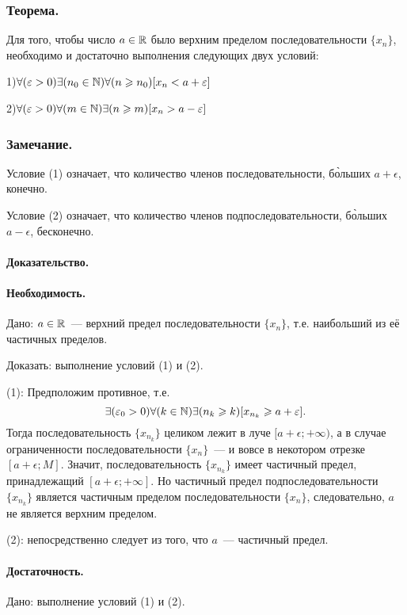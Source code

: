 \subsubsection{Теорема.}

Для того, чтобы число $a \in \mathbb{R}$ было верхним пределом последовательности $\{x_n\}$, необходимо и достаточно выполнения следующих двух условий:

1)$\forall(\varepsilon >0 )\exists(n_0 \in \mathbb{N})\forall(n \geqslant n_0)[x_n < a + \varepsilon]$

2)$\forall(\varepsilon > 0)\forall(m   \in \mathbb{N})\exists(n \geqslant m  )[x_n > a - \varepsilon]$

\subsubsection{Замечание.}
Условие (1) означает, что количество членов последовательности, б\`{о}льших $a+\epsilon$, конечно.

Условие (2) означает, что количество членов подпоследовательности, б\`{о}льших $a-\epsilon$, бесконечно.

\paragraph{Доказательство.}

\paragraph{Необходимость.}
Дано:
$a \in \mathbb{R}$~--- верхний предел последовательности $\{x_n\}$, т.е. наибольший из её частичных пределов.

Доказать: выполнение условий (1) и (2).

(1): Предположим противное, т.е.
$$
	\exists(\varepsilon_0 >0 )\forall(k \in \mathbb{N})\exists(n_k \geqslant k)[x_{n_k} \geqslant a + \varepsilon]
	.
$$
Тогда последовательность $\{x_{n_k}\}$ целиком лежит в луче $[a + \epsilon; +\infty)$,
а в случае ограниченности последовательности $\{x_n\}$~--- и вовсе в некотором отрезке $[a + \epsilon; M]$.
Значит, последовательность $\{x_{n_k}\}$ имеет частичный предел, принадлежащий $[a + \epsilon; +\infty]$.
Но частичный предел подпоследовательности $\{x_{n_k}\}$ является частичным пределом последовательности $\{x_n\}$,
следовательно, $a$ не является верхним пределом.

(2): непосредственно следует из того, что $a$~--- частичный предел.

\paragraph{Достаточность.}
Дано: выполнение условий (1) и (2).

